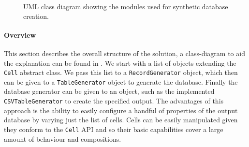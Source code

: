 \begin{figure}[t]
\caption{UML class diagram showing the modules used for synthetic database
creation.}
\label{fig:project:benchmark:creation-class-diagram}
\end{figure}

\paragraph{Overview} This section describes the overall structure of the
solution, a class-diagram to aid the explanation can be found in
.
We start with a list of objects extending the \lstinline{Cell}
abstract class. We pass this list to a \lstinline{RecordGenerator} object, which
then can be given to a \lstinline{TableGenerator} object to generate the
database. Finally the database generator can be given to an object, such as the
implemented \lstinline{CSVTableGenerator} to create the
specified output. The advantages of this approach is the ability to easily
configure a handful of properties of the output database by varying just the list of cells.
Cells can be easily manipulated given they conform to the \lstinline{Cell} API
and so their basic capabilities cover a large amount of behaviour and
compositions.

